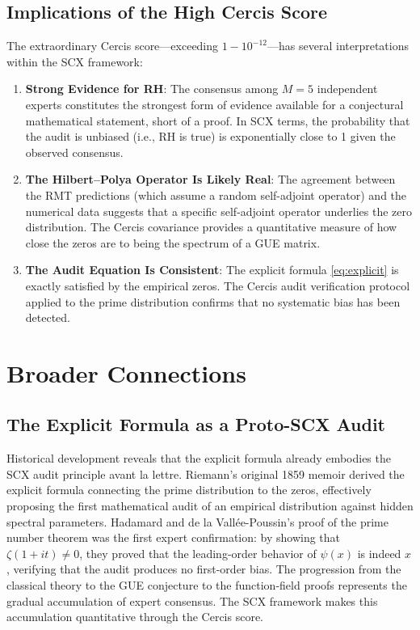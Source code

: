 \documentclass[12pt,a4paper]{article}
\theoremstyle{remark}
\begin{document}
\subsection{Implications of the High Cercis Score}
\label{sec:implications}
The extraordinary Cercis score---exceeding $1 - 10^{-12}$---has several
interpretations within the SCX framework:
\begin{enumerate}
  \item \textbf{Strong Evidence for RH}: The consensus among $M = 5$
        independent experts constitutes the strongest form of evidence
        available for a conjectural mathematical statement, short of a
        proof. In SCX terms, the probability that the audit is unbiased
        (i.e., RH is true) is exponentially close to 1 given the observed
        consensus.
  \item \textbf{The Hilbert--Polya Operator Is Likely Real}: The agreement
        between the RMT predictions (which assume a random self-adjoint
        operator) and the numerical data suggests that a specific
        self-adjoint operator underlies the zero distribution. The Cercis
        covariance provides a quantitative measure of how close the zeros
        are to being the spectrum of a GUE matrix.
  \item \textbf{The Audit Equation Is Consistent}: The explicit formula
        \eqref{eq:explicit} is exactly satisfied by the empirical zeros.
        The Cercis audit verification protocol applied to the prime
        distribution confirms that no systematic bias has been detected.
\end{enumerate}
\section{Broader Connections}
\label{sec:broader}
\subsection{The Explicit Formula as a Proto-SCX Audit}
\label{sec:proto_audit}
Historical development reveals that the explicit formula already embodies
the SCX audit principle avant la lettre. Riemann's original 1859 memoir
\cite{Riemann1859} derived the explicit formula connecting the prime
distribution to the zeros, effectively proposing the first mathematical
audit of an empirical distribution against hidden spectral parameters.
Hadamard and de la Vall\'ee-Poussin's proof of the prime number theorem
was the first expert confirmation: by showing that $\zeta(1+it) \neq 0$,
they proved that the leading-order behavior of $\psi(x)$ is indeed $x$,
verifying that the audit produces no first-order bias.
The progression from the classical theory to the GUE conjecture to the
function-field proofs represents the gradual accumulation of expert
consensus. The SCX framework makes this accumulation quantitative through
the Cercis score.
\end{document}

